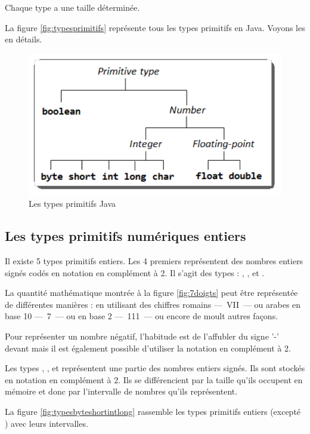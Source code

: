 Chaque type a une taille déterminée. 

La figure \vref{fig:typesprimitifs} représente tous les types primitifs en
Java. Voyons les en détails.

\begin{figure}[h]
	\centering
	\includegraphics[width=.7\linewidth]{images/primitifs.pdf}
	\caption{Les types primitifs Java}
	\label{fig:typesprimitifs}
\end{figure}

\subsection{Les types primitifs numériques entiers}

Il existe 5 types primitifs entiers. Les 4 premiers représentent des nombres
entiers signés codés en notation en complément à 2. Il s'agit des types
: , ,  et . 


La quantité mathématique montrée à la figure \vref{fig:7doigts} peut être
représentée de différentes manières : en utilisant des chiffres romains —~VII~—
ou arabes en base 10 —~7~— ou en base 2 —~111~— ou encore de moult autres
façons. 

Pour représenter un nombre négatif, l'habitude est de l'affubler du signe '-'
devant mais il est également possible d'utiliser la notation en complément à 2. 

Les types , ,  et  représentent une partie
des nombres entiers signés. Ils sont stockés en notation en complément à 2. Ils
se différencient par la taille qu'ils occupent en mémoire et donc par
l'intervalle de nombres qu'ils représentent. 

La figure \vref{fig:typesbyteshortintlong} rassemble les types primitifs
entiers (excepté ) avec leurs intervalles. 

